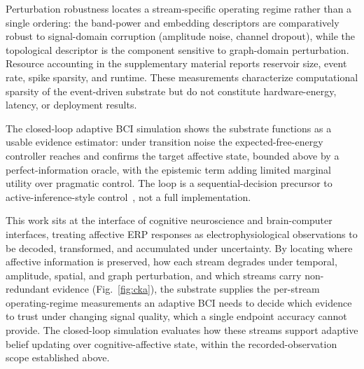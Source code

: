 \documentclass[journal]{IEEEtran}
\begin{document}
Perturbation robustness locates a stream-specific operating regime rather than a single ordering: the band-power and embedding descriptors are comparatively robust to signal-domain corruption (amplitude noise, channel dropout), while the topological descriptor is the component sensitive to graph-domain perturbation. Resource accounting in the supplementary material reports reservoir size, event rate, spike sparsity, and runtime. These measurements characterize computational sparsity of the event-driven substrate but do not constitute hardware-energy, latency, or deployment results.

The closed-loop adaptive BCI simulation shows the substrate functions as a usable evidence estimator: under transition noise the expected-free-energy controller reaches and confirms the target affective state, bounded above by a perfect-information oracle, with the epistemic term adding limited marginal utility over pragmatic control. The loop is a sequential-decision precursor to active-inference-style control~\cite{friston2010free,parr2022activeinference}, not a full implementation.

This work sits at the interface of cognitive neuroscience and brain-computer interfaces, treating affective ERP responses as electrophysiological observations to be decoded, transformed, and accumulated under uncertainty. By locating where affective information is preserved, how each stream degrades under temporal, amplitude, spatial, and graph perturbation, and which streams carry non-redundant evidence (Fig.~\ref{fig:cka}), the substrate supplies the per-stream operating-regime measurements an adaptive BCI needs to decide which evidence to trust under changing signal quality, which a single endpoint accuracy cannot provide. The closed-loop simulation evaluates how these streams support adaptive belief updating over cognitive-affective state, within the recorded-observation scope established above.
\end{document}
